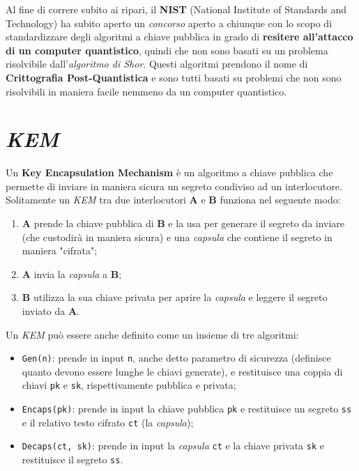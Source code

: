 Al fine di correre subito ai ripari, il \textbf{NIST} (National Institute of Standards and Technology) ha subito aperto un \emph{concorso} aperto a chiunque con lo scopo di standardizzare degli algoritmi a chiave pubblica in grado di \textbf{resitere all'attacco di un computer quantistico}, quindi che non sono basati su un problema risolvibile dall'\emph{algoritmo di Shor}. Questi algoritmi prendono il nome di \textbf{Crittografia Post-Quantistica} e sono tutti basati su problemi che non sono risolvibili in maniera facile nemmeno da un computer quantistico. \cite{wikipedia_quantum_computing}


\section{\emph{KEM}}
Un \textbf{Key Encapsulation Mechanism} è un algoritmo a chiave pubblica che permette di inviare in maniera sicura un segreto condiviso ad un interlocutore. Solitamente un \emph{KEM} tra due interlocutori \textbf{A} e \textbf{B} funziona nel seguente modo:
\begin{enumerate}
    \item \textbf{A} prende la chiave pubblica di \textbf{B} e la usa per generare il segreto da inviare (che custodirà in maniera sicura) e una \emph{capsula} che contiene il segreto in maniera "cifrata";
    \item \textbf{A} invia la \emph{capsula} a \textbf{B};
    \item \textbf{B} utilizza la sua chiave privata per aprire la \emph{capsula} e leggere il segreto inviato da \textbf{A}.
\end{enumerate}

Un \emph{KEM} può essere anche definito come un insieme di tre algoritmi:
\begin{itemize}
    \item \texttt{Gen(n)}: prende in input \texttt{n}, anche detto parametro di sicurezza (definisce quanto devono essere lunghe le chiavi generate), e restituisce una coppia di chiavi \texttt{pk} e \texttt{sk}, rispettivamente pubblica e privata;
    \item \texttt{Encaps(pk)}: prende in input la chiave pubblica \texttt{pk} e restituisce un segreto \texttt{ss} e il relativo testo cifrato \texttt{ct} (la \emph{capsula});
    \item \texttt{Decaps(ct, sk)}: prende in input la \emph{capsula} \texttt{ct} e la chiave privata \texttt{sk} e restituisce il segreto \texttt{ss}.
\end{itemize}

